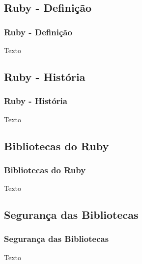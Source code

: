 \subsection{Ruby - Definição} 
\begin{frame}
 \frametitle{Ruby - Definição}
 Texto
\end{frame}

\subsection{Ruby - História} 
\begin{frame}
 \frametitle{Ruby - História}
 Texto
\end{frame}


\subsection{Bibliotecas do Ruby} 
\begin{frame}
 \frametitle{Bibliotecas do Ruby}
 Texto
\end{frame}

\subsection{Segurança das Bibliotecas} 
\begin{frame}
 \frametitle{Segurança das Bibliotecas}
 Texto
\end{frame}